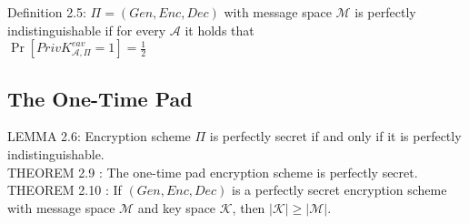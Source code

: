 Definition 2.5: $\Pi=(Gen,Enc,Dec)$ with message space $\mathcal{M}$ is 
perfectly indistinguishable if for every $\mathcal{A}$ it holds that\\
$\Pr[PrivK^{eav}_{\mathcal{A},\Pi}=1]=\frac{1}{2}$\\

\subsection*{The One-Time Pad}
LEMMA 2.6: Encryption scheme $\Pi$ is perfectly secret if 
and only if it is perfectly indistinguishable.\\

{\color{forestgreen} THEOREM 2.9 \color{forestgreen}}
: The one-time pad encryption scheme is perfectly secret.\\


{\color{forestgreen} THEOREM 2.10 \color{forestgreen}}:
 If $(Gen, Enc, Dec)$ is a perfectly secret encryption scheme with 
message space $\mathcal{M}$ and key space $\mathcal{K}$, then 
$|\mathcal{K}|\ge|\mathcal{M}|$.
